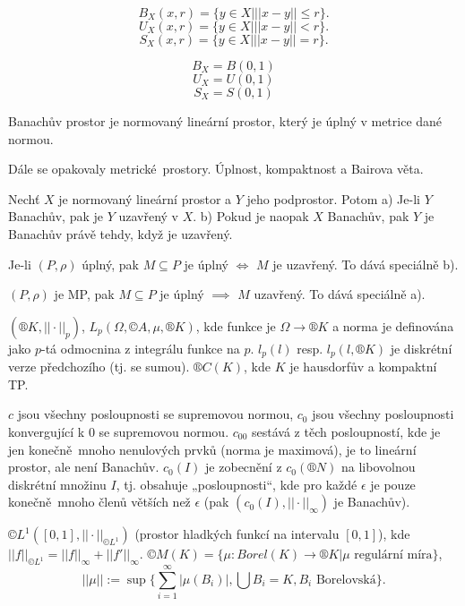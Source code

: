 \documentclass[12pt]{article}					%
\begin{document}
\begin{definice}
	$$ B_X\left(x, r\right) = \{ y \in X | ||x - y|| ≤ r \}.  $$ 
	$$ U_X\left(x, r\right) = \{ y \in X | ||x - y|| < r \}.  $$ 
	$$ S_X\left(x, r\right) = \{ y \in X | ||x - y|| = r \}.  $$ 

	$$ B_X = B\left(0, 1\right)  $$ 
	$$ U_X = U\left(0, 1\right)  $$ 
	$$ S_X = S\left(0, 1\right)  $$ 
\end{definice}

\begin{definice}
	Banachův prostor je normovaný lineární prostor, který je úplný v metrice dané normou.
\end{definice}

Dále se opakovaly metrické prostory. Úplnost, kompaktnost a Bairova věta.

\begin{tvrzeni}
	Nechť $X$ je normovaný lineární prostor a $Y$ jeho podprostor. Potom a) Je-li $Y$ Banachův, pak je $Y$ uzavřený v $X$. b) Pokud je naopak $X$ Banachův, pak $Y$ je Banachův právě tehdy, když je uzavřený.

	\begin{dukazin}
		Je-li $\left(P,\rho\right)$ úplný, pak $M \subseteq P$ je úplný $\Leftrightarrow$ $M$ je uzavřený. To dává speciálně b).

		$\left(P, \rho\right)$ je MP, pak $M \subseteq P$ je úplný $\implies$ $M$ uzavřený. To dává speciálně a).
	\end{dukazin}
\end{tvrzeni}

\begin{priklady}
	$\left(®K, ||·||_p\right)$, $L_p(\Omega, ©A, \mu, ®K)$, kde funkce je $\Omega \rightarrow ®K$ a norma je definována jako $p$-tá odmocnina z integrálu funkce na $p$. $l_p(l)$ resp. $l_p(l, ®K)$ je diskrétní verze předchozího (tj. se sumou). $®C(K)$, kde $K$ je hausdorfův a kompaktní TP.

	$c$ jsou všechny posloupnosti se supremovou normou, $c_0$ jsou všechny posloupnosti konvergující k 0 se supremovou normou. $c_{00}$ sestává z těch posloupností, kde je jen konečně mnoho nenulových prvků (norma je maximová), je to lineární prostor, ale není Banachův. $c_0(I)$ je zobecnění z $c_0(®N)$ na libovolnou diskrétní množinu $I$, tj. obsahuje „posloupnosti“, kde pro každé $\epsilon$ je pouze konečně mnoho členů větších než $\epsilon$ (pak $(c_0(I), ||·||_∞)$ je Banachův).

	$©L^1([0, 1], || · ||_{©L^1})$ (prostor hladkých funkcí na intervalu $[0, 1]$), kde $||f||_{©L^1} = ||f||_∞ + ||f'||_∞$. $©M(K) = \{\mu : Borel(K) \rightarrow ®K | \mu \text{ regulární míra}\}$,
	$$ ||\mu|| := \sup\{\sum_{i=1}^∞|\mu(B_i)|, \bigcup B_i = K, B_i \text{ Borelovská}\}. $$
\end{priklady}
\end{document}
